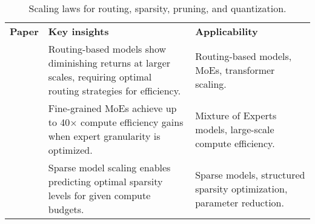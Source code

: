 \begin{table*}[!htb]
    \centering
    \begin{tabular}{p{3.5cm} p{5.2cm} p{5.2cm}}
        \cline{1-3}
        \textbf{Paper} & \textbf{Key insights} & \textbf{Applicability} \\
        \cline{1-3}
        \citet{clark_unified_2022} & Routing-based models show diminishing returns at larger scales, requiring optimal routing strategies for efficiency. & Routing-based models, MoEs, transformer scaling. \\
        \cline{1-3}
        \citet{krajewski_scaling_2024} & Fine-grained MoEs achieve up to 40$\times$ compute efficiency gains when expert granularity is optimized. & Mixture of Experts models, large-scale compute efficiency. \\
        \cline{1-3}
        \citet{frantar_scaling_2023} & Sparse model scaling enables predicting optimal sparsity levels for given compute budgets. & Sparse models, structured sparsity optimization, parameter reduction. \\
        \cline{1-3}
    \end{tabular}
    \caption{Scaling laws for routing, sparsity, pruning, and quantization.}
    \label{tab:scaling_laws5}
\end{table*}
